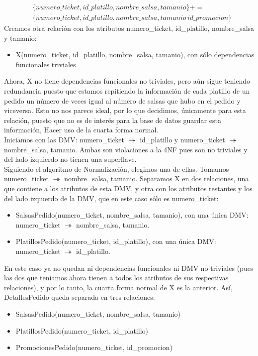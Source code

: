 \documentclass[11pt]{article}
\begin{document}
\begin{itemize}
      \begin{align*}      
      &\{numero\_ticket, id\_platillo, nombre\_salsa, tamanio\}+=\\
      &\{numero\_ticket, id\_platillo, nombre\_salsa, tamanio\, id\_promocion\}
      \end{align*}
      Creamos otra relación con los atributos numero\_ticket, id\_platillo, nombre\_salsa y tamanio:
      \begin{itemize}
      \item X(numero\_ticket, id\_platillo, nombre\_salsa, tamanio), con sólo dependencias funcionales triviales
      \end{itemize}
      Ahora, X no tiene dependencias funcionales no triviales, pero aún sigue teniendo redundancia puesto que estamos repitiendo la información de cada platillo de un pedido un número de veces igual al número de salsas que hubo en el pedido y viceversa. Esto no nos parece ideal, por lo que decidimos, únicamente para esta relación, puesto que no es de interés para la base de datos guardar esta información, Hacer uso de la cuarta forma normal.\\
      Iniciamos con las DMV: numero\_ticket $\twoheadrightarrow$ id\_platillo y numero\_ticket $\twoheadrightarrow$ nombre\_salsa, tamanio. Ambas son violaciones a la 4NF pues son no triviales y del lado izquierdo no tienen una superllave.\\
      Siguiendo el algoritmo de Normalización, elegimos una de ellas. Tomamos numero\_ticket $\twoheadrightarrow$ nombre\_salsa, tamanio. Separamos X en dos relaciones, una que contiene a los atributos de esta DMV, y otra con los atributos restantes y los del lado izqiuerdo de la DMV, que en este caso sólo es numero\_ticket:
      \begin{itemize}
      \item SalsasPedido(numero\_ticket, nombre\_salsa, tamanio), con una única DMV: numero\_ticket $\twoheadrightarrow$ nombre\_salsa, tamanio.
      \item PlatillosPedido(numero\_ticket, id\_platillo), con una única DMV: numero\_ticket $\twoheadrightarrow$ id\_platillo.
      \end{itemize}
      En este caso ya no quedan ni dependencias funcionales ni DMV no triviales (pues las dos que teníamos ahora tienen a todos los atributos de sus respectivas relaciones), y por lo tanto, la cuarta forma normal de X es la anterior. 
      Así, DetallesPedido queda separada en tres relaciones:
      \begin{itemize}
      \item SalsasPedido(numero\_ticket, nombre\_salsa, tamanio)
      \item PlatillosPedido(numero\_ticket, id\_platillo)
      \item PromocionesPedido(numero\_ticket, id\_promocion)
      \end{itemize}
\end{itemize}
\end{document}
